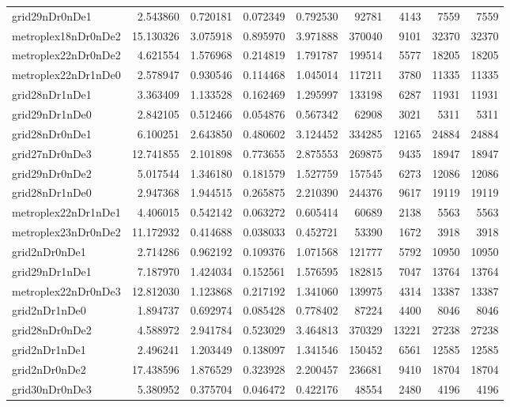 \documentclass[../../../thesis.tex]{subfiles}
\begin{document}
\begin{longtable}{|l|r|r|r|r|r|r|r|r|}
grid29nDr0nDe1 & 2.543860 & 0.720181 & 0.072349 & 0.792530 & 92781 & 4143 & 7559 & 7559 \\
metroplex18nDr0nDe2 & 15.130326 & 3.075918 & 0.895970 & 3.971888 & 370040 & 9101 & 32370 & 32370 \\
metroplex22nDr0nDe2 & 4.621554 & 1.576968 & 0.214819 & 1.791787 & 199514 & 5577 & 18205 & 18205 \\
metroplex22nDr1nDe0 & 2.578947 & 0.930546 & 0.114468 & 1.045014 & 117211 & 3780 & 11335 & 11335 \\
grid28nDr1nDe1 & 3.363409 & 1.133528 & 0.162469 & 1.295997 & 133198 & 6287 & 11931 & 11931 \\
grid29nDr1nDe0 & 2.842105 & 0.512466 & 0.054876 & 0.567342 & 62908 & 3021 & 5311 & 5311 \\
grid28nDr0nDe1 & 6.100251 & 2.643850 & 0.480602 & 3.124452 & 334285 & 12165 & 24884 & 24884 \\
grid27nDr0nDe3 & 12.741855 & 2.101898 & 0.773655 & 2.875553 & 269875 & 9435 & 18947 & 18947 \\
grid29nDr0nDe2 & 5.017544 & 1.346180 & 0.181579 & 1.527759 & 157545 & 6273 & 12086 & 12086 \\
grid28nDr1nDe0 & 2.947368 & 1.944515 & 0.265875 & 2.210390 & 244376 & 9617 & 19119 & 19119 \\
metroplex22nDr1nDe1 & 4.406015 & 0.542142 & 0.063272 & 0.605414 & 60689 & 2138 & 5563 & 5563 \\
metroplex23nDr0nDe2 & 11.172932 & 0.414688 & 0.038033 & 0.452721 & 53390 & 1672 & 3918 & 3918 \\
grid2nDr0nDe1 & 2.714286 & 0.962192 & 0.109376 & 1.071568 & 121777 & 5792 & 10950 & 10950 \\
grid29nDr1nDe1 & 7.187970 & 1.424034 & 0.152561 & 1.576595 & 182815 & 7047 & 13764 & 13764 \\
metroplex22nDr0nDe3 & 12.812030 & 1.123868 & 0.217192 & 1.341060 & 139975 & 4314 & 13387 & 13387 \\
grid2nDr1nDe0 & 1.894737 & 0.692974 & 0.085428 & 0.778402 & 87224 & 4400 & 8046 & 8046 \\
grid28nDr0nDe2 & 4.588972 & 2.941784 & 0.523029 & 3.464813 & 370329 & 13221 & 27238 & 27238 \\
grid2nDr1nDe1 & 2.496241 & 1.203449 & 0.138097 & 1.341546 & 150452 & 6561 & 12585 & 12585 \\
grid2nDr0nDe2 & 17.438596 & 1.876529 & 0.323928 & 2.200457 & 236681 & 9410 & 18704 & 18704 \\
grid30nDr0nDe3 & 5.380952 & 0.375704 & 0.046472 & 0.422176 & 48554 & 2480 & 4196 & 4196 \\

\end{longtable}
\end{document}

